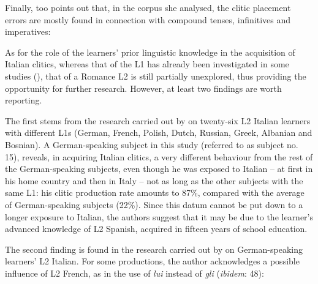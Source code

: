 \documentclass[output=paper,modfonts,nonflat,newtxmath]{langsci/langscibook}
\begin{document}
\z

\z

Finally, \citet[58]{Corino2012} too points out that, in the corpus she analysed, the clitic placement errors are mostly found in connection with compound tenses, infinitives and imperatives:

\z

As for the role of the learners’ prior linguistic knowledge in the acquisition of Italian clitics, whereas that of the L1 has already been investigated in some studies (\citealt{Berretta1986, LeoniniBelletti2004, BennatiMatteini2006, GianniniCancila2006,Giannini2008, Maffei2009}), that of a Romance L2 is still partially unexplored, thus providing the opportunity for further research. However, at least two findings are worth reporting.

The first stems from the research carried out by \citet{LeoniniBelletti2004} on twenty-six L2 Italian learners with different L1s (German, French, Polish, Dutch, Russian, Greek, Albanian and Bosnian). A German-speaking subject in this study (referred to as subject no. 15), reveals, in acquiring Italian clitics, a very different behaviour from the rest of the German-speaking subjects, even though he was exposed to Italian – at first in his home country and then in Italy – not as long as the other subjects with the same L1: his clitic production rate amounts to 87\%, compared with the average of German-speaking subjects (22\%). Since this datum cannot be put down to a longer exposure to Italian, the authors suggest that it may be due to the learner’s advanced knowledge of L2 Spanish, acquired in fifteen years of school education.

The second finding is found in the research carried out by \citet{Corino2012} on German-speaking learners’ L2 Italian. For some productions, the author acknowledges a possible influence of L2 French, as in the use of \textit{lui} instead of \textit{gli} (\textit{ibidem}: 48):
\end{document}
